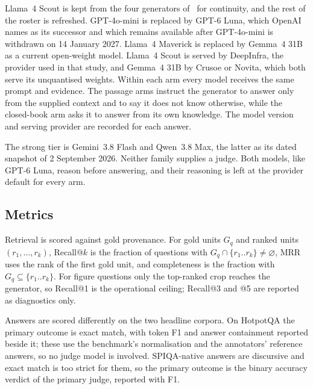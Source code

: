 \documentclass[preprint,12pt]{elsarticle}
\begin{document}
Llama~4 Scout is kept from the four generators of~\cite{jonah2026whendo} for
continuity, and the rest of the roster is refreshed. GPT-4o-mini is replaced
by GPT-6 Luna, which OpenAI names as its successor and which remains
available after GPT-4o-mini is withdrawn on 14 January 2027. Llama~4 Maverick
is replaced by Gemma~4 31B as a current open-weight model. Llama~4 Scout is
served by DeepInfra, the provider used in that study, and Gemma~4 31B by
Crusoe or Novita, which both serve its unquantised weights. Within each arm every model receives the
same prompt and evidence. The passage arms instruct the generator to answer
only from the supplied context and to say it does not know otherwise, while
the closed-book arm asks it to answer from its own knowledge. The model
version and serving provider are recorded for each answer.

The strong tier is Gemini~3.8 Flash and Qwen~3.8 Max, the latter as its
dated snapshot of 2 September 2026. Neither family supplies a judge. Both
models, like GPT-6 Luna, reason before answering,
and their reasoning is left at the provider default for every arm.

\subsection{Metrics}
\label{sec:metrics}

Retrieval is scored against gold provenance. For gold units $G_q$ and ranked
units $(r_1,\dots,r_k)$, Recall@$k$ is the fraction of questions with $G_q\cap\{r_1..r_k\}\neq
\varnothing$, MRR uses the rank of the first gold unit, and completeness is the
fraction with $G_q\subseteq\{r_1..r_k\}$. For figure questions only the
top-ranked crop reaches the generator, so Recall@1 is the operational ceiling;
Recall@3 and @5 are reported as diagnostics only.

Answers are scored differently on the two headline corpora. On HotpotQA the
primary outcome is exact match, with token F1 and answer containment reported
beside it; these use the benchmark's normalisation and the annotators'
reference answers, so no judge model is involved. SPIQA-native answers are discursive and exact match is too strict
for them, so the primary outcome is the binary accuracy verdict of the primary
judge, reported with F1.
\end{document}
